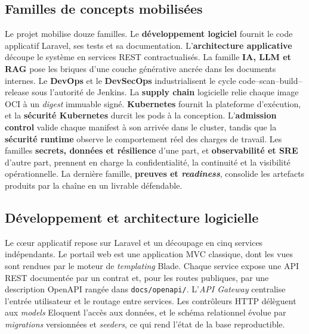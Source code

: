 \subsection{Familles de concepts mobilisées}
\label{subsec:familles-concepts}

Le projet mobilise douze familles. Le \textbf{développement logiciel}
fournit le code applicatif Laravel, ses tests et sa documentation.
L'\textbf{architecture applicative} découpe le système en services REST
contractualisés. La famille \textbf{IA, LLM et RAG} pose les briques d'une
couche générative ancrée dans les documents internes. Le \textbf{DevOps} et
le \textbf{DevSecOps} industrialisent le cycle code--scan--build--release
sous l'autorité de Jenkins. La \textbf{supply chain} logicielle relie
chaque image OCI à un \emph{digest} immuable signé. \textbf{Kubernetes}
fournit la plateforme d'exécution, et la \textbf{sécurité Kubernetes}
durcit les pods à la conception. L'\textbf{admission control} valide
chaque manifest à son arrivée dans le cluster, tandis que la
\textbf{sécurité runtime} observe le comportement réel des charges de
travail. Les familles \textbf{secrets, données et résilience} d'une part,
et \textbf{observabilité et SRE} d'autre part, prennent en charge la
confidentialité, la continuité et la visibilité opérationnelle. La
dernière famille, \textbf{preuves et \emph{readiness}}, consolide les
artefacts produits par la chaîne en un livrable défendable.

\subsection{Développement et architecture logicielle}
\label{subsec:concepts-developpement}

Le cœur applicatif repose sur Laravel et un découpage en cinq services
indépendants. Le portail web est une application MVC classique, dont les
vues sont rendues par le moteur de \emph{templating} Blade. Chaque service
expose une API REST documentée par un contrat et, pour les routes
publiques, par une description OpenAPI rangée dans
\texttt{docs/openapi/}. L'\emph{API Gateway} centralise l'entrée
utilisateur et le routage entre services. Les contrôleurs HTTP délèguent
aux \emph{models} Eloquent l'accès aux données, et le schéma relationnel
évolue par \emph{migrations} versionnées et \emph{seeders}, ce qui rend
l'état de la base reproductible.

